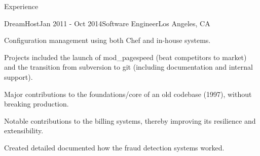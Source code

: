 \documentclass{resume} %
\begin{document}
\begin{rSection}{Experience}
\begin{rSubsection}{DreamHost}{Jan 2011 - Oct 2014}{Software Engineer}{Los Angeles, CA}
\item Configuration management using both Chef and in-house systems.
\item Projects included the launch of mod\_pagespeed (beat competitors to market) and the transition from subversion to git (including documentation and internal support).
\item Major contributions to the foundations/core of an old codebase (1997), without breaking production.
\item Notable contributions to the billing systems, thereby improving its resilience and extensibility.
\item Created detailed documented how the fraud detection systems worked.

\end{rSubsection}
\end{rSection}
\end{document}
